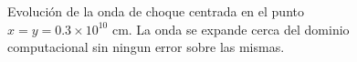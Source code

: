 \documentclass[12pt,a4paper]{book}
\begin{document}
\begin{figure}
\centering
\caption{\label{fig:HLL-relativista-no-centrado} Evolución de la onda de choque centrada en el punto $x=y = 0.3 \times 10^{10}$ cm. 
La onda se expande cerca del dominio computacional sin ningun error sobre las mismas.}
\end{figure}
\end{document}
